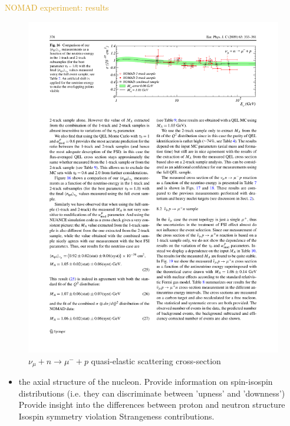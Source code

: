 \documentclass[11pt]{beamer} %
\renewcommand{\(}{\begin{columns}}
\renewcommand{\)}{\end{columns}}
\newcommand{\<}[1]{\begin{column}{#1}}
\renewcommand{\>}{\end{column}}
\newcommand{\itt}{\begin{itemize}}
\newcommand{\tti}{\end{itemize}}
\newcommand{\hlt}[2]{\textcolor{#1}{\textbf{#2}}}
\begin{document}
\begin{frame}{\textcolor{Goldenrod}{NOMAD experiment: results}}
  \begin{overlayarea}{\textwidth}{\textheight}
  \begin{figure}[h]
    \centering
    \includegraphics[height=0.4\textheight, width=0.8\linewidth]{./Images/NOMAD04}
    \caption*{$\nu_{\mu} + n \to \mu^- + p$ quasi-elastic scattering cross-section}
  \end{figure}
  
  \itt[<only@+>]
\item the axial structure of the nucleon. Provide information on
  spin-isospin distributions (i.e. they can discriminate between
  'upness' and 'downness') Provide insight into the differences between
  proton and neutron structure Isospin symmetry violation Strangeness
  contributions.
  \tti 
\end{overlayarea}
\end{frame}
\end{document}
